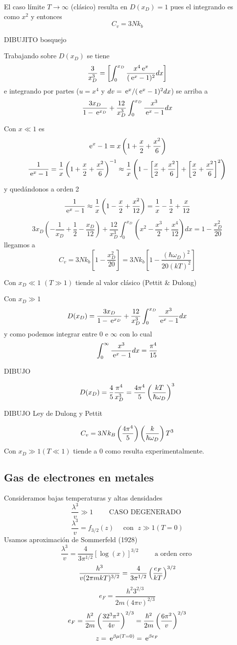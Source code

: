 \documentclass[10pt,oneside]{CBFT_book}
\begin{document}
El caso límite $ T \rightarrow \infty $ (clásico) resulta en $ D(x_D) = 1 $ pues el integrando
es como $ x^2 $ y entonces 
\[
	C_v = 3Nk_b
\]

DIBUJITO bosquejo

Trabajando sobre $ D(x_D) $ se tiene 
\[
	\frac{3}{x_D^3} = \left[ \int_0^{x_D} \frac{x^4 \:\mathrm{e}^{x} }{(\:\mathrm{e}^{x}-1)^2} dx \right]
\]
e integrando por partes ($u=x^4$ y $dv=\:\mathrm{e}^x/(\:\mathrm{e}^x-1)^2 dx$) se arriba a
\[
	\frac{3x_D}{1-\:\mathrm{e}^{x_D}} + \frac{12}{x_D^3} \int_0^{x_D} \frac{ x^3 }{\:\mathrm{e}^{x}-1} dx
\]

Con $ x \ll 1$ es 
\[
	\:\mathrm{e}^x - 1 = x \left( 1 + \frac{x}{2} + \frac{x^2}{6} \right)
\]
\[
	\frac{1}{\:\mathrm{e}^x - 1} = \frac{1}{x} \left( 1 + \frac{x}{2} + \frac{x^2}{6} \right)^{-1}
	\approx \frac{1}{x} \left( 1 - \left[ \frac{x}{2} + \frac{x^2}{6} \right] + 
	\left[ \frac{x}{2} + \frac{x^2}{6} \right]^2 \right)
\]
y quedándonos a orden 2
\[
	\frac{1}{\:\mathrm{e}^x - 1} \approx \frac{1}{x} \left( 1 - \frac{x}{2} + \frac{x^2}{12} \right) =
	\frac{1}{x} - \frac{1}{2} + \frac{x}{12}
\]
\[
	3x_D \left( -\frac{1}{x_D} + \frac{1}{2} - \frac{x_D}{12} \right) + 
	\frac{12}{x_D^3} \int_0^{x_D} \left( x^2 - \frac{x^3}{2} + \frac{x^4}{12} \right) dx
	= 1 - \frac{x_D^2}{20}
\]
llegamos a 
\[
	C_v = 3Nk_b \left[ 1 - \frac{x_D^2}{20} \right] =
	3Nk_b \left[ 1 - \frac{(\hbar\omega_D)^2}{20(kT)^2} \right]
\]

Con $ x_D \ll 1 $ $ (T \gg 1) $ tiende al valor clásico (Pettit \& Dulong)

Con $ x_D \gg 1 $
\[
	D(x_D) = \frac{3x_D}{1-\:\mathrm{e}^{x_D}} + \frac{12}{x_D^3} \int_0^{x_D} \frac{ x^3 }{\:\mathrm{e}^{x}-1} dx
\]
y como podemos integrar entre $0$ e $\infty$ con lo cual 
\[
	\int_0^\infty \frac{ x^3 }{\:\mathrm{e}^{x}-1} dx = \frac{\pi^4}{15}
\]

DIBUJO

\[
	D(x_D) = \frac{4}{5} \frac{\pi^4}{x_D^3} = \frac{4\pi^4}{5} \left( \frac{ kT }{ \hbar\omega_D } \right)^3  
\]

DIBUJO Ley de Dulong y Pettit

\[
	C_v = 3Nk_B \left( \frac{ 4\pi^4 }{ 5 } \right) \left( \frac{ k }{ \hbar\omega_D } \right) T^3
\]
Con $ x_D \gg 1 (T \ll 1) $ tiende a $0$ como resulta experimentalmente.

\subsection{Gas de electrones en metales}

Consideramos bajas temperaturas y altas densidades
\[
	\frac{\lambda^3}{v} \gg 1 \qquad \text{ CASO DEGENERADO }
\]
\[
	\frac{\lambda^3}{v} = f_{3/2}(z) \quad \text{ con } \; z \gg 1 (T=0)
\]
Usamos aproximación de Sommerfeld (1928)
\[
	\frac{\lambda^3}{v} = \frac{4}{3\pi^{1/2}} [ \log (x) ]^{3/2} \qquad \text{ a orden cero }
\]
\[
	\frac{h^3}{v( 2 \pi m k T )^{3/2}} = \frac{4}{3\pi^{1/2}} \left( \frac{ e_F }{ kT } \right)^{3/2}
\]
\[
	e_F = \frac{h^2 3^{2/3}}{2m(4\pi v)^{2/3}}
\]
\[
	e_F = \frac{\hbar^2}{2m} \left( \frac{ 3 2^3 \pi^2  }{ 4v } \right)^{2/3} = \frac{\hbar^2}{2m}\left( \frac{ 6\pi^2 }{ v } \right)^{2/3}
\]
\[
	z = \:\mathrm{e}^{\beta \mu(T=0)} = \:\mathrm{e}^{\beta e_F} 
\]
\end{document}
